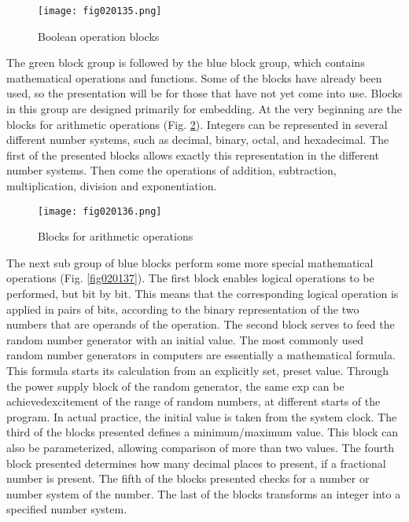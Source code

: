 \begin{figure}[H]
   \centering
   \texttt{[image: fig020135.png]}
   \caption{Boolean operation blocks}
\label{fig020135}
\end{figure}

The green block group is followed by the blue block group, which contains mathematical operations and functions. Some of the blocks have already been used, so the presentation will be for those that have not yet come into use. Blocks in this group are designed primarily for embedding. At the very beginning are the blocks for arithmetic operations (Fig. \ref{fig020136}). Integers can be represented in several different number systems, such as decimal, binary, octal, and hexadecimal. The first of the presented blocks allows exactly this representation in the different number systems. Then come the operations of addition, subtraction, multiplication, division and exponentiation.

\begin{figure}[H]
   \centering
   \texttt{[image: fig020136.png]}
   \caption{Blocks for arithmetic operations}
\label{fig020136}
\end{figure}

The next sub group of blue blocks perform some more special mathematical operations (Fig. \ref{fig020137}). The first block enables logical operations to be performed, but bit by bit. This means that the corresponding logical operation is applied in pairs of bits, according to the binary representation of the two numbers that are operands of the operation. The second block serves to feed the random number generator with an initial value. The most commonly used random number generators in computers are essentially a mathematical formula. This formula starts its calculation from an explicitly set, preset value. Through the power supply block of the random generator, the same exp can be achievedexcitement of the range of random numbers, at different starts of the program. In actual practice, the initial value is taken from the system clock. The third of the blocks presented defines a minimum/maximum value. This block can also be parameterized, allowing comparison of more than two values. The fourth block presented determines how many decimal places to present, if a fractional number is present. The fifth of the blocks presented checks for a number or number system of the number. The last of the blocks transforms an integer into a specified number system.

